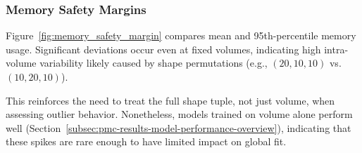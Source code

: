\subsubsection{Memory Safety Margins}
\label{subsec:memory-safety-margins}

Figure~\ref{fig:memory_safety_margin} compares mean and 95th-percentile memory usage.
Significant deviations occur even at fixed volumes, indicating high intra-volume variability likely caused by shape permutations (e.g., $(20,10,10)$ vs. $(10,20,10)$).

This reinforces the need to treat the full shape tuple, not just volume, when assessing outlier behavior.
Nonetheless, models trained on volume alone perform well (Section~\ref{subsec:pmc-results-model-performance-overview}), indicating that these spikes are rare enough to have limited impact on global fit.

